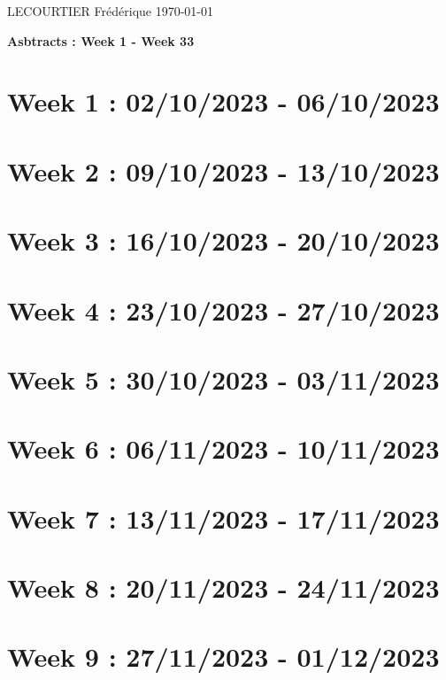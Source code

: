 \documentclass[french]{article}
\begin{document}
	LECOURTIER Frédérique \hfill \today
	\begin{center}
		\Large\textbf{{Asbtracts : Week 1 - Week 33}}
	\end{center}

	\section{Week 1 : 02/10/2023 - 06/10/2023}
	

	\section{Week 2 : 09/10/2023 - 13/10/2023}
	

	\section{Week 3 : 16/10/2023 - 20/10/2023}
	

	\section{Week 4 : 23/10/2023 - 27/10/2023}
	

	\section{Week 5 : 30/10/2023 - 03/11/2023}
	

	\section{Week 6 : 06/11/2023 - 10/11/2023}
	

	\section{Week 7 : 13/11/2023 - 17/11/2023}
	

	\section{Week 8 : 20/11/2023 - 24/11/2023}
	

	\section{Week 9 : 27/11/2023 - 01/12/2023}
	
\end{document}

